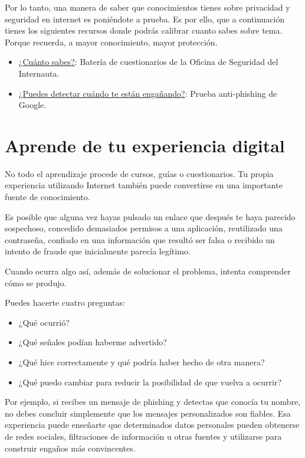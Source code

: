 \documentclass[
  spanish,
  a4paper,
  openany]{book}
\begin{document}
Por lo tanto, una manera de saber que conocimientos tienes sobre privacidad y seguridad en internet es poniéndote a prueba. Es por ello, que a continuación tienes los siguientes recursos donde podrás calibrar cuanto sabes sobre tema. Porque recuerda, a mayor conocimiento, mayor protección.

\begin{itemize}
\item
  \href{https://www.incibe.es/ciudadania/formacion/autoevaluacion}{¿Cuánto sabes?}: Batería de cuestionarios de la Oficina de Seguridad del Internauta.
\item
  \href{https://phishingquiz.withgoogle.com/?hl=es}{¿Puedes detectar cuándo te están engañando?}: Prueba anti-phishing de Google.
\end{itemize}

\section{Aprende de tu experiencia digital}\label{aprende-de-tu-experiencia-digital}

No todo el aprendizaje procede de cursos, guías o cuestionarios. Tu propia experiencia utilizando Internet también puede convertirse en una importante fuente de conocimiento.

Es posible que alguna vez hayas pulsado un enlace que después te haya parecido sospechoso, concedido demasiados permisos a una aplicación, reutilizado una contraseña, confiado en una información que resultó ser falsa o recibido un intento de fraude que inicialmente parecía legítimo.

Cuando ocurra algo así, además de solucionar el problema, intenta comprender cómo se produjo.

Puedes hacerte cuatro preguntas:

\begin{itemize}
\item
  ¿Qué ocurrió?
\item
  ¿Qué señales podían haberme advertido?
\item
  ¿Qué hice correctamente y qué podría haber hecho de otra manera?
\item
  ¿Qué puedo cambiar para reducir la posibilidad de que vuelva a ocurrir?
\end{itemize}

Por ejemplo, si recibes un mensaje de phishing y detectas que conocía tu nombre, no debes concluir simplemente que los mensajes personalizados son fiables. Esa experiencia puede enseñarte que determinados datos personales pueden obtenerse de redes sociales, filtraciones de información u otras fuentes y utilizarse para construir engaños más convincentes.
\end{document}
